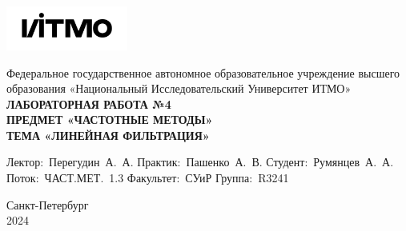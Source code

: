 \documentclass[a4paper, 12pt]{article}
\begin{document}
    \begin{titlepage}

        \begin{center}
        \includegraphics[width=0.3\textwidth]{itmo.png} %
        \vfill

        Федеральное государственное автономное образовательное учреждение высшего образования
        «Национальный Исследовательский Университет ИТМО»\\

        \vfill
        {\large\bf ЛАБОРАТОРНАЯ РАБОТА №4}\\
        {\large\bf ПРЕДМЕТ «ЧАСТОТНЫЕ МЕТОДЫ»}\\
        {\large\bf ТЕМА «ЛИНЕЙНАЯ ФИЛЬТРАЦИЯ»}
        \vfill

        \begin{flushright}
            \begin{minipage}{.45\textwidth}
            {
                \hbox{Лектор: Перегудин А. А.}
                \hbox{Практик: Пашенко А. В.}
                \hbox{Студент: Румянцев А. А.}
                \hbox{Поток: ЧАСТ.МЕТ. 1.3}
                \hbox{}
                \hbox{Факультет: СУиР}
                \hbox{Группа: R3241}
            }
            \end{minipage}
        \end{flushright}

        \vfill

        Санкт-Петербург\\
        2024
        \end{center}
    \end{titlepage}

    \tableofcontents

    \newpage
\end{document}
